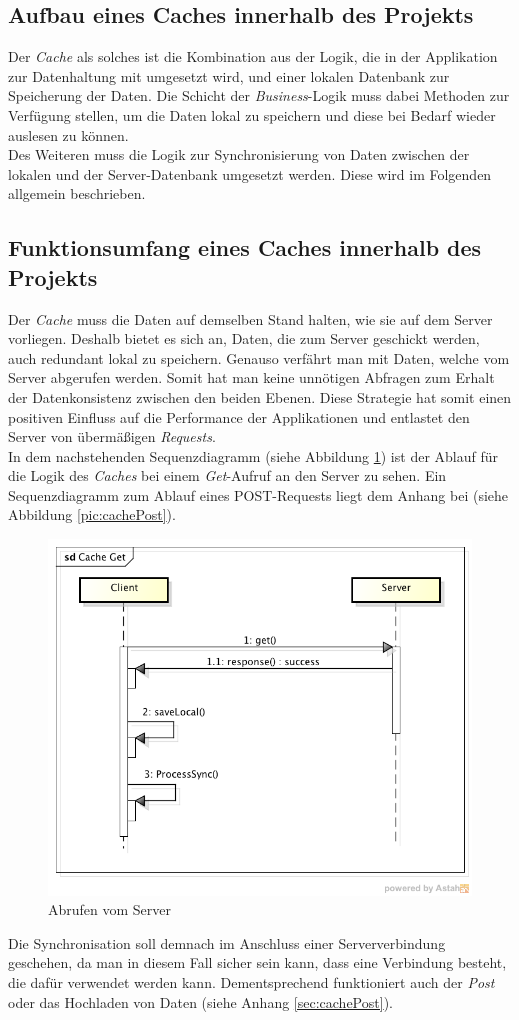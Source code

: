\subsection{Aufbau eines Caches innerhalb des Projekts}
\label{ssec:cache-aufbau}
Der \textit{Cache} als solches ist die Kombination aus der Logik, die in der Applikation zur Datenhaltung mit umgesetzt wird, und einer lokalen Datenbank zur Speicherung der Daten. Die Schicht der \textit{Business}-Logik muss dabei Methoden zur Verfügung stellen, um die Daten lokal zu speichern und diese bei Bedarf wieder auslesen zu können.\\
Des Weiteren muss die Logik zur Synchronisierung von Daten zwischen der lokalen und der Server-Datenbank umgesetzt werden. Diese wird im Folgenden allgemein beschrieben.
\subsection{Funktionsumfang eines Caches innerhalb des Projekts}
\label{ssec:cache-unsere-funktionsweise}
Der \textit{Cache} muss die Daten auf demselben Stand halten, wie sie auf dem Server vorliegen. Deshalb bietet es sich an, Daten, die zum Server geschickt werden, auch redundant lokal zu speichern. Genauso verfährt man mit Daten, welche vom Server abgerufen werden. Somit hat man keine unnötigen Abfragen zum Erhalt der Datenkonsistenz zwischen den beiden Ebenen. Diese Strategie hat somit einen positiven Einfluss auf die Performance der Applikationen und entlastet den Server von übermäßigen \textit{Requests}. \\
In dem nachstehenden Sequenzdiagramm (siehe Abbildung \ref{pic:cacheGet}) ist der Ablauf für die Logik des \textit{Caches} bei einem \textit{Get}-Aufruf an den Server zu sehen. Ein Sequenzdiagramm zum Ablauf eines POST-Requests liegt dem Anhang bei (siehe Abbildung \ref{pic:cachePost}).\\
\begin{figure}[!h]
\centering
\includegraphics[width=0.8\linewidth]{content/images/Cache-Get}
\caption{Abrufen vom Server}
\label{pic:cacheGet}
\end{figure}
Die Synchronisation soll demnach im Anschluss einer Serververbindung geschehen, da man in diesem Fall sicher sein kann, dass eine Verbindung besteht, die dafür verwendet werden kann. Dementsprechend funktioniert auch der \textit{Post} oder das Hochladen von Daten (siehe Anhang \ref{sec:cachePost}).